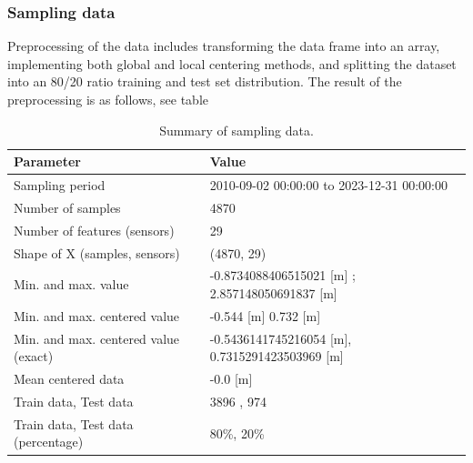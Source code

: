 \subsubsection{Sampling data}
Preprocessing of the data includes transforming the data frame into an array, implementing both global and local centering methods, and splitting the dataset into an 80/20 ratio training and test set distribution. The result of the preprocessing is as follows, see table 
\begin{table}[htbp]
\centering
\caption{Summary of sampling data.}
\label{data}
\begin{tabular}{|l|l|}
\hline
\textbf{Parameter}                           & \textbf{Value}                                \\ \hline
Sampling period                              & 2010-09-02 00:00:00 to 2023-12-31 00:00:00   \\ \hline
Number of samples                            & 4870                                          \\ \hline
Number of features (sensors)                 & 29                                            \\ \hline
Shape of X (samples, sensors)                & (4870, 29)                                    \\ \hline
Min. and max. value                          & -0.8734088406515021 [m] ; 2.857148050691837 [m] \\ \hline
Min. and max. centered value                 & -0.544 [m] 0.732 [m]                         \\ \hline
Min. and max. centered value (exact)         & -0.5436141745216054 [m], 0.7315291423503969 [m] \\ \hline
Mean centered data                           & -0.0 [m]                                     \\ \hline
Train data, Test data                        & 3896 , 974                                   \\ \hline
Train data, Test data (percentage)           & 80\%, 20\%                                  \\ \hline
\end{tabular}
\end{table} 


